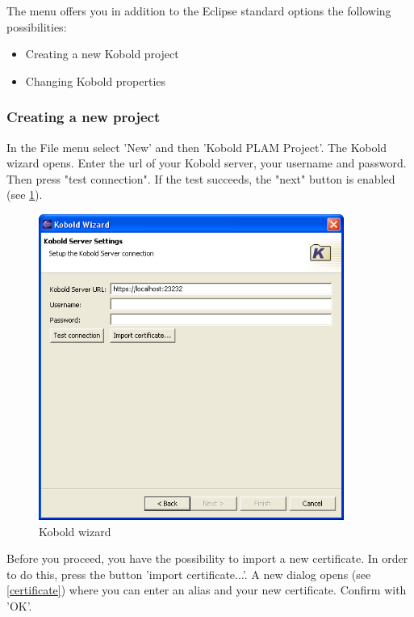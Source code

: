 The menu offers you in addition to the Eclipse standard options the following
possibilities:
\begin{itemize}
	\item Creating a new Kobold project
	\item Changing Kobold properties
\end{itemize}

\subsubsection{Creating a new project}

In the File menu select 'New' and then 'Kobold PLAM Project'. The Kobold wizard opens.
Enter the url of your Kobold server, your username and password. Then press
"test connection". If the test succeeds, the "next" button is enabled (see \ref{wizard1}).

\begin{figure}[h!]
\begin{center}
\includegraphics[width=10cm]{wizard1.png}
   \caption{Kobold wizard}
\label{wizard1}
\end{center}
\end{figure}\par

Before you proceed, you have the possibility to import a new certificate. In order to do this,
press the button 'import certificate...'. A new dialog opens (see \ref{certificate}) where you 
can enter an alias and your new certificate. Confirm with 'OK'.

